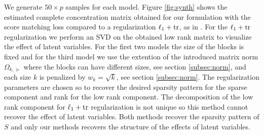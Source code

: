 We generate $50\times p$ samples for each model. Figure \ref{fig:synth} shows the estimated complete concentration matrix obtained for our formulation with the score matching loss compared to a regularization $\ell_1+{\rm tr}$, as in \citet{chandrasekaran2010}. For  the $\ell_1+{\rm tr}$ regularization we perform an SVD on the obtained low rank matrix to visualize the effect of latent variables. For the first two models the size of the blocks is fixed and for the third model we use the extention of the introduced matrix norm $\Omega_{k,\succeq}$ where the blocks can have different sizes, see section \ref{subsec:norm},  and each size $k$ is penalized by $w_{k}=\sqrt{k}$, see section \ref{subsec:norm}. The regularization parameters are chosen so to recover the desired sparsity pattern for the sparse component and rank for the low rank component.  The decomposition of the low rank component for $\ell_1+{\rm tr}$ regularization is not unique so this method cannot recover the effect of latent variables. Both methods recover the sparsity pattern of $S$ and only our methods recovers the structure of the effects of latent variables.




